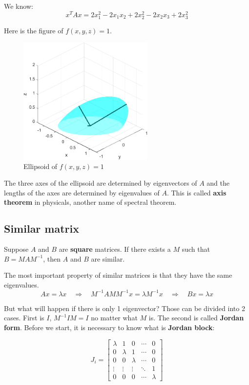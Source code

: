 \documentclass[12pt]{ctexart}
\begin{document}
We know:
\[
  x^{T}Ax = 2x_1^2 - 2x_1x_2 + 2x_2^2 - 2x_2x_3 + 2x_3^2
\]

Here is the figure of $f(x, y, z) = 1$.
\begin{figure}[H]
  \centering
  \includegraphics[width=0.6\textwidth]{assets/5.4 Positive definition matrix/Ellipsoid.png}
  \caption{Ellipsoid of $f(x, y, z) = 1$}
\end{figure}

The three axes of the ellipsoid are determined by eigenvectors of $A$ and the lengths
of the axes are determined by eigenvalues of $A$. This is called \textbf{axis theorem}
in physicals, another name of spectral theorem.

\subsection{\textbf{Similar matrix}}

Suppose $A$ and $B$ are \textbf{square} matrices. If there exists a $M$ such that
$B = MAM^{-1}$, then $A$ and $B$ are similar.

The most important property of similar matrices is that they have the same eigenvalues.
\[
  Ax = \lambda x \quad \Rightarrow \quad
  M^{-1}AMM^{-1}x = \lambda M^{-1}x \quad \Rightarrow \quad Bx = \lambda x
\]

But what will happen if there is only 1 eigenvector? Those can be divided into 2
cases. First is $I$, $M^{-1}IM = I$ no matter what $M$ is. The second is called
\textbf{Jordan form}. Before we start, it is necessary to know what is \textbf{Jordan
block}:

\[
  J_i = \begin{bmatrix}
    \lambda & 1 & 0 & \cdots & 0 \\
    0 & \lambda & 1 & \cdots & 0 \\
    0 & 0 & \lambda & \cdots & 0 \\
    \vdots & \vdots & \vdots & \ddots & 1 \\
    0 & 0 & 0 & \cdots & \lambda
  \end{bmatrix}
\]
\end{document}
